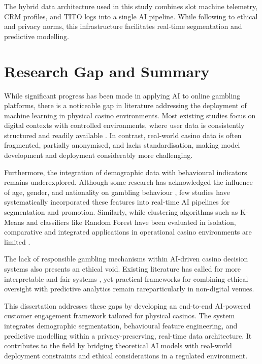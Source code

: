 \documentclass[12pt,a4paper]{report}
\begin{document}
The hybrid data architecture used in this study combines slot machine telemetry, CRM profiles, and TITO logs into a single AI pipeline.  While following to ethical and privacy norms, this infrastructure facilitates real-time segmentation and predictive modelling.

\section{Research Gap and Summary}

While significant progress has been made in applying AI to online gambling platforms, there is a noticeable gap in literature addressing the deployment of machine learning in physical casino environments. Most existing studies focus on digital contexts with controlled environments, where user data is consistently structured and readily available \citep{Auer2023, Omike2022a}. In contrast, real-world casino data is often fragmented, partially anonymised, and lacks standardisation, making model development and deployment considerably more challenging.

Furthermore, the integration of demographic data with behavioural indicators remains underexplored. Although some research has acknowledged the influence of age, gender, and nationality on gambling behaviour \citep{Hing2014, Desiata2024a}, few studies have systematically incorporated these features into real-time AI pipelines for segmentation and promotion. Similarly, while clustering algorithms such as K-Means and classifiers like Random Forest have been evaluated in isolation, comparative and integrated applications in operational casino environments are limited \citep{MacQueen1967, Breiman2001}.

The lack of responsible gambling mechanisms within AI-driven casino decision systems also presents an ethical void. Existing literature has called for more interpretable and fair systems \citep{Ladouceur2016, Abarbanel2022}, yet practical frameworks for combining ethical oversight with predictive analytics remain rareparticularly in non-digital venues.

This dissertation addresses these gaps by developing an end-to-end AI-powered customer engagement framework tailored for physical casinos. The system integrates demographic segmentation, behavioural feature engineering, and predictive modelling within a privacy-preserving, real-time data architecture. It contributes to the field by bridging theoretical AI models with real-world deployment constraints and ethical considerations in a regulated environment.
\end{document}
